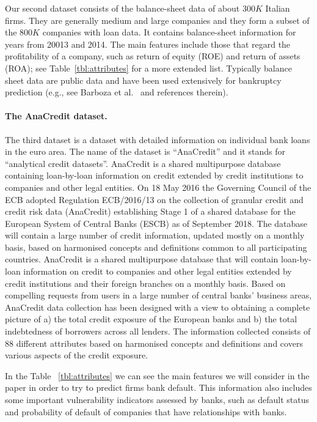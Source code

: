Our second dataset consists of the balance-sheet data of about $300K$
Italian firms. They are generally medium and large companies and they
form a subset of the $800K$ companies with loan data. 
It contains balance-sheet information for years from 20013 and 2014.
The main features include those that regard the profitability of a company, such as return
of equity (ROE) and return of assets (ROA); see Table~\ref{tbl:attributes} for a more
extended list. Typically balance sheet data are public data and have been used extensively for
bankruptcy prediction (e.g., see Barboza et
al.~\cite{altman-bankruptcy-17} and references therein).

\paragraph{The AnaCredit dataset.}

The third dataset is a dataset with detailed information on individual bank loans in the euro area. The name of the dataset is “AnaCredit” and it stands for “analytical credit datasets”.
AnaCredit is a shared multipurpose database containing loan-by-loan information on credit extended by credit institutions to companies and other legal entities. On 18 May 2016 the Governing Council of the ECB adopted Regulation ECB/2016/13 on the collection of granular credit and credit risk data (AnaCredit) establishing Stage 1 of a shared database for the European System of Central Banks (ESCB) as of September 2018. The database will contain a large number of credit information, updated mostly on a monthly basis, based on harmonised concepts and definitions common to all participating countries.
AnaCredit is a shared multipurpose database that will contain loan-by-loan information on credit to companies and other legal entities extended by credit institutions and their foreign branches on a monthly basis. Based on compelling requests from   users in a large number of central banks’ business areas, AnaCredit data collection has been designed with a view to obtaining a complete picture of a) the total credit exposure of the European banks and b) the total indebtedness of borrowers across all lenders. The information collected consists of 88 different attributes based on harmonised concepts and definitions and covers various aspects of the credit exposure.

In the Table ~\ref{tbl:attributes} we can see the main features we will consider in the paper in order to try to predict firms bank default. 
This information also includes some important vulnerability indicators assessed by banks, such as default status and probability of default of companies that have relationships with banks.

